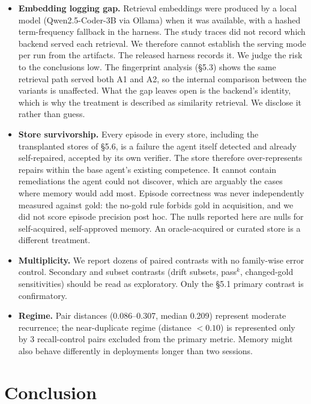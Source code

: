 \documentclass[sigconf, nonacm]{acmart}
\begin{document}
\begin{itemize}
\item \textbf{Embedding logging gap.} Retrieval embeddings were produced by a local model (Qwen2.5-Coder-3B via Ollama) when it was available, with a hashed term-frequency fallback in the harness. The study traces did not record which backend served each retrieval. We therefore cannot establish the serving mode per run from the artifacts. The released harness records it. We judge the risk to the conclusions low. The fingerprint analysis (\S5.3) shows the same retrieval path served both A1 and A2, so the internal comparison between the variants is unaffected. What the gap leaves open is the backend's identity, which is why the treatment is described as similarity retrieval. We disclose it rather than guess.
\item \textbf{Store survivorship.} Every episode in every store, including the transplanted stores of \S5.6, is a failure the agent itself detected and already self-repaired, accepted by its own verifier. The store therefore over-represents repairs within the base agent's existing competence. It cannot contain remediations the agent could not discover, which are arguably the cases where memory would add most. Episode correctness was never independently measured against gold: the no-gold rule forbids gold in acquisition, and we did not score episode precision post hoc. The nulls reported here are nulls for self-acquired, self-approved memory. An oracle-acquired or curated store is a different treatment.
\item \textbf{Multiplicity.} We report dozens of paired contrasts with no family-wise error control. Secondary and subset contrasts (drift subsets, pass$^k$, changed-gold sensitivities) should be read as exploratory. Only the \S5.1 primary contrast is confirmatory.
\item \textbf{Regime.} Pair distances (0.086--0.307, median 0.209) represent moderate recurrence; the near-duplicate regime (distance $< 0.10$) is represented only by 3 recall-control pairs excluded from the primary metric. Memory might also behave differently in deployments longer than two sessions.
\end{itemize}

\section{Conclusion}
\end{document}
